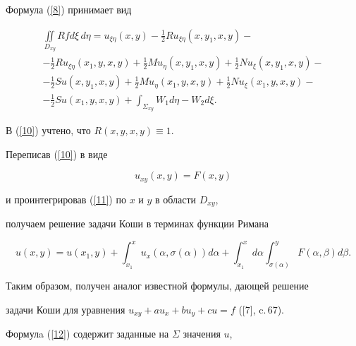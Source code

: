 Формула (\ref{8}) принимает вид


\begin{multline}\label{10}


\iint\limits_{D_{xy}} Rfd\xi\, d\eta


=u_{\xi\eta}(x,y)-\frac{1}{2}Ru_{\xi\eta}(x,y_1,x,y)-\\


-\frac{1}{2}Ru_{\xi\eta}(x_1,y,x,y)


+\frac{1}{2}Mu_{\eta}(x,y_1,x,y)+\frac{1}{2}Nu_{\xi}(x,y_1,x,y)-\\


-\frac{1}{2}Su(x,y_1,x,y)


+\frac{1}{2}Mu_{\eta}(x_1,y,x,y)+\frac{1}{2}Nu_{\xi}(x_1,y,x,y)-\\


-\frac{1}{2}Su(x_1,y,x,y)+\int_{\Sigma_{xy}} W_1 d\eta - W_2 d\xi .


\end{multline}


В (\ref{10}) учтено, что $R(x,y,x,y)\equiv 1$.





Переписав (\ref{10}) в виде


\begin{equation}\label{11}


u_{xy}(x,y)=F(x,y)


\end{equation}


и проинтегрировав (\ref{11}) по $x$ и $y$ в области $D_{xy}$,


получаем решение задачи Коши в терминах функции Римана


\begin{equation}\label{12}


u(x,y)=u(x_{1},y)+\int_{x_{1}}^{x}u_{x}(\alpha,\sigma(\alpha))d\alpha


+\int_{x_{1}}^{x}d\alpha \int_{\sigma(\alpha)}^{y}


F(\alpha,\beta)d\beta.


\end{equation}


Таким образом, получен аналог известной формулы, дающей решение


задачи Коши для уравнения $u_{xy}+au_{x}+bu_{y}+cu=f$ ([7], c.\,67).





Формулa  (\ref{12}) содержит заданные на $\Sigma$ значения $u$,


